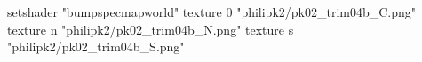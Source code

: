 setshader "bumpspecmapworld"
    texture 0 "philipk2/pk02_trim04b_C.png"
    texture n "philipk2/pk02_trim04b_N.png"
    texture s "philipk2/pk02_trim04b_S.png"